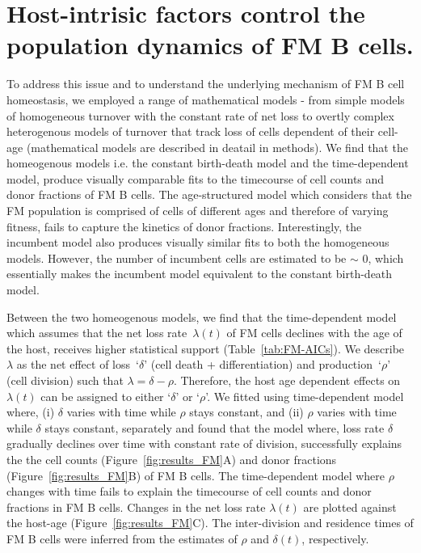 \documentclass[11.5pt]{article}
\begin{document}
\section*{Host-intrisic factors control the population dynamics of FM B cells.} 
To address this issue and to understand the underlying mechanism of FM B cell homeostasis, we employed a range of mathematical models - from simple models of homogeneous turnover with the constant rate of net loss to overtly complex heterogenous models of turnover that track loss of cells dependent of their cell-age (mathematical models are described in deatail in methods). 
We find that the homeogenous models i.e. the constant birth-death model and the time-dependent model, produce visually comparable fits to the timecourse of cell counts and donor fractions of FM B cells.
The age-structured model which considers that the FM population is comprised of cells of different ages and therefore of varying fitness, fails to capture the kinetics of donor fractions.
Interestingly, the incumbent model also produces visually similar fits to both the homogeneous models.
However, the number of incumbent cells are estimated to be $\sim$ 0, which essentially makes the incumbent model equivalent to the constant birth-death model. 

Between the two homeogenous models, we find that the time-dependent model which assumes that the net loss rate~$\lambda(t)$ of FM cells declines with the age of the host, receives higher statistical support (Table~\ref{tab:FM-AICs}).
We describe~$\lambda$ as the net effect of loss~`$\delta$' (cell death + differentiation) and production~`$\rho$' (cell division) such that $\lambda = \delta - \rho$.
Therefore, the host age dependent effects on $\lambda(t)$ can be assigned to either `$\delta$' or `$\rho$'. 
We fitted using time-dependent model where,
(i) $\delta$ varies with time while $\rho$ stays constant, and
(ii) $\rho$ varies with time while $\delta$ stays constant, separately and found that 
the model where, loss rate $\delta$ gradually declines over time with constant rate of division, successfully explains the the cell counts (Figure~\ref{fig:results_FM}A) and donor fractions (Figure~\ref{fig:results_FM}B) of FM B cells.
The time-dependent model where $\rho$ changes with time fails to explain the timecourse of cell counts and donor fractions in FM B cells.
Changes in the net loss rate $\lambda(t)$ are plotted against the host-age (Figure~\ref{fig:results_FM}C). The inter-division and residence times of FM B cells were inferred from the estimates of $\rho$ and $\delta(t)$, respectively.
\end{document}
